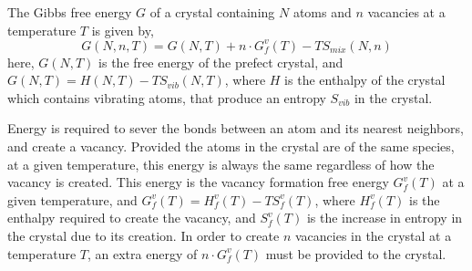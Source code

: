 \documentclass{article}
\begin{document}
The Gibbs free energy $G$ of a crystal containing $N$ atoms and $n$ vacancies at a temperature $T$ is given by,
%
\begin{equation} \label{eq:50}
G(N, n, T) = G(N, T) + n\cdot G^v_f(T) - TS_{mix} (N, n)
\end{equation}
%
here, $G(N, T)$ is the free energy of the prefect crystal, and $G(N, T) = H(N, T) - TS_{vib}(N, T)$, where $H$ is the enthalpy of the crystal which contains vibrating atoms, that produce an entropy $S_{vib}$ in the crystal. 

Energy is required to sever the bonds between an atom and its nearest neighbors, and create a vacancy. Provided the atoms in the crystal are of the same species, at a given temperature, this energy is always the same regardless of how the vacancy is created. This energy is the vacancy formation free energy $G^v_f(T)$ at a given temperature, and $G^v_f(T) = H^v_f(T) - TS^v_f(T)$, where $H^v_f(T)$ is the enthalpy required to create the vacancy, and $S^v_f(T)$ is the increase in entropy in the crystal due to its creation. In order to create $n$ vacancies in the crystal at a temperature $T$, an extra energy of $n\cdot G^v_f (T)$ must be provided to the crystal.
\end{document}
